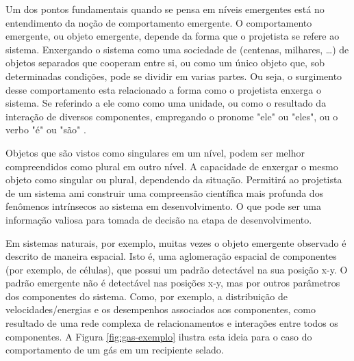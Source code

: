     
    Um dos pontos fundamentais quando se pensa em níveis emergentes está no entendimento da noção de comportamento emergente. %
    O comportamento emergente, ou objeto emergente, depende da forma que o projetista se refere ao sistema. Enxergando o sistema como uma sociedade de (centenas, milhares, \ldots) de objetos separados que cooperam entre si, ou como um único objeto que, sob determinadas condições, pode se dividir em varias partes. Ou seja, o surgimento desse comportamento esta relacionado a forma como o projetista enxerga o sistema. Se referindo a ele como como uma unidade, ou como o resultado da interação de diversos componentes, empregando o pronome "ele" ou "eles", ou o verbo "é" ou "são" \cite{wilensky1999thinking}.
    
    Objetos que são vistos como singulares em um nível, podem ser melhor compreendidos como plural em outro nível. A capacidade de enxergar o mesmo objeto como singular ou plural, dependendo da situação. Permitirá ao projetista de um sistema \acrshort{ami} construir uma compreensão científica mais profunda dos fenômenos intrínsecos ao sistema em desenvolvimento. O que pode ser uma informação valiosa para tomada de decisão na etapa de desenvolvimento.%

    
    Em sistemas naturais, por exemplo, muitas vezes o objeto emergente observado é descrito de maneira espacial. Isto é, uma aglomeração espacial de componentes (por exemplo, de células), que possui um padrão detectável na sua posição x-y. O padrão emergente não é detectável nas posições x-y, mas por outros parâmetros dos componentes do sistema. Como, por exemplo, a distribuição de velocidades/energias e os desempenhos associados aos componentes, como resultado de uma rede complexa de relacionamentos e interações entre todos os componentes. A Figura \ref{fig:gas-exemplo} ilustra esta ideia para o caso do comportamento de um gás em um recipiente selado. 
    
